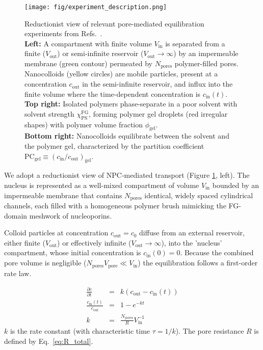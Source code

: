 \documentclass[10pt, a4paper]{article}
\begin{document}
\begin{multicols}{2}

\begin{figure}[H]
    \centering
    \texttt{[image: fig/experiment\_description.png]}
    \caption{Reductionist view of relevant pore-mediated equilibration experiments from Refs.~\cite{Ribbeck2001, Mohr2009, Popken2015, Timney2016, Frey2018}.\\
    \textbf{Left:} A compartment with finite volume $V_{\text{in}}$ is separated from a finite ($V_\text{out}$) or semi-infinite reservoir ($V_\text{out}\to \infty$)  by an impermeable membrane (green contour) permeated by $N_{\text{pores}}$ polymer-filled pores. 
    Nanocolloids (yellow circles) are mobile particles, present at a concentration $c_{\text{out}}$ in the semi-infinite reservoir, and influx into the finite volume where the time-dependent concentration is $c_{\text{in}}(t)$.\\
    \textbf{Top right:} Isolated polymers phase-separate in a poor solvent with solvent strength $\chi_{\text{PS}}^{\text{FG}}$, forming polymer gel droplets (red irregular shapes) with polymer volume fraction $\phi_{\text{gel}}$.\\
    \textbf{Bottom right:} Nanocolloids equilibrate between the solvent and the polymer gel, characterized by the partition coefficient $\text{PC}_{\text{gel}} \equiv \left(c_{\text{in}}/c_{\text{out}}\right)_{\text{gel}}$.
    }
    \label{fig:experiments_overview}
\end{figure}
    
We adopt a reductionist view of NPC‐mediated transport (Figure \ref{fig:experiments_overview}, left). 
The nucleus is represented as a well-mixed compartment of volume $V_{\text{in}}$ bounded by an impermeable membrane that contains $N_{\text{pores}}$ identical, widely spaced cylindrical channels, each filled with a homogeneous polymer brush mimicking the FG-domain meshwork of nucleoporins. 

Colloid particles at concentration $c_{\text{out}} = c_{0}$ diffuse from an external reservoir, either finite ($V_{\text{out}}$) or effectively infinite ($V_{\text{out}}\!\to\!\infty$), into the 'nucleus' compartment, whose initial concentration is $c_{\text{in}}(0)=0$.
Because the combined pore volume is negligible ($N_{\text{pores}}V_{\text{pore}}\ll V_{\text{in}}$) the equilibration follows a first-order rate law.

\begin{eqnarray}
    \frac{\partial c}{\partial t} &=& k (c_{\text{out}} - c_{\text{in}}(t)) \\
    \frac{c_{\text{in}}(t)}{c_{\text{out}}} &=& 1 - e^{-kt} \label{eq:kinetics} \\
    k &=& \frac{N_{\text{pores}}}{R} V_{\text{in}}^{-1}
    \label{eq:rate_constant}
\end{eqnarray}
$k$ is the rate constant (with characteristic time $\tau = 1/k$).
The pore resistance $R$ is defined by Eq.~\ref{eq:R_total}.


\end{multicols}
\end{document}
